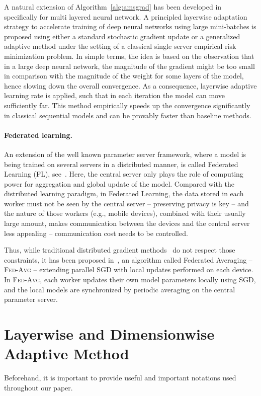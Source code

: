 \documentclass{article}
\begin{document}
A natural extension of Algorithm~\ref{alg:amsgrad} has been developed in~\citet{you2019large} specifically for multi layered neural network. 
A principled layerwise adaptation strategy to accelerate training of deep neural networks using large mini-batches is proposed using either a standard stochastic gradient update or a generalized adaptive method under the setting of a classical single server empirical risk minimization problem. 
 In simple terms, the idea is based on the observation that in a large deep neural network, the magnitude of the gradient might be too small in comparison with the magnitude of the weight for some layers of the model, hence slowing down the overall convergence. 
As a consequence, layerwise adaptive learning rate is applied, such that in each iteration the model can move sufficiently far. 
This method empirically speeds up the convergence significantly in classical sequential models and can be provably faster than baseline methods.


\medskip
\paragraph{Federated learning.}
An extension of the well known parameter server framework, where a model is being trained on several servers in a distributed manner, is called Federated Learning (FL), see~\citet{konevcny2016federated}.
Here, the central server only plays the role of computing power for aggregation and global update of the model.
Compared with the distributed learning paradigm, in Federated Learning, the data stored in each worker must not be seen by the central server -- preserving privacy is key -- and the nature of those workers (e.g., mobile devices), combined with their usually large amount, makes communication between the devices and the central server less appealing -- communication cost needs to be controlled.

Thus, while traditional distributed gradient methods~\citep{recht2011hogwild,li2014scaling,zhao2020distributed} do not respect those constraints, it has been proposed in~\citet{mcmahan2017communication}, an algorithm called Federated Averaging -- \textsc{Fed-Avg} -- extending parallel SGD with local updates performed on each device. 
In \textsc{Fed-Avg}, each worker updates their own model parameters locally using SGD, and the local models are synchronized by periodic averaging on the central parameter server.


\section{Layerwise and Dimensionwise Adaptive Method}\label{sec:main}
Beforehand, it is important to provide useful and important notations used throughout our paper.
\end{document}
